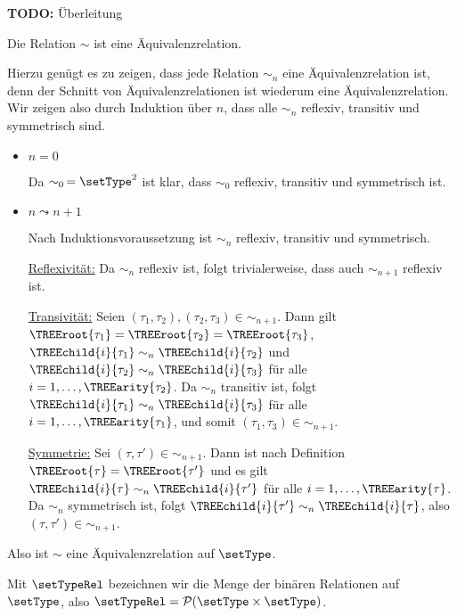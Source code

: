 {\bf TODO:} \"Uberleitung

\begin{lemma} \label{lemma:Lort:Aequivalenzrelation}
  Die Relation $\sim$ ist eine \"Aquivalenzrelation.
\end{lemma}

\begin{beweis}
  Hierzu gen\"ugt es zu zeigen, dass jede Relation $\sim_n$ eine \"Aquivalenzrelation ist, denn der Schnitt von
  \"Aquivalenzrelationen ist wiederum eine \"Aquivalenzrelation. Wir zeigen also durch Induktion \"uber $n$,
  dass alle $\sim_n$ reflexiv, transitiv und symmetrisch sind.
  \begin{itemize}
    \item $n = 0$

          Da $\sim_0\,=\setType^2$ ist klar, dass $\sim_0$ reflexiv, transitiv und symmetrisch ist.

    \item $n \leadsto n+1$

          Nach Induktionsvoraussetzung ist $\sim_n$ reflexiv, transitiv und symmetrisch.

          \noindent\underline{Reflexivit\"at:} Da $\sim_n$ reflexiv ist, folgt trivialerweise, dass auch $\sim_{n+1}$ reflexiv ist.

          \noindent\underline{Transivit\"at:} Seien $(\tau_1,\tau_2),(\tau_2,\tau_3)\in\sim_{n+1}$. Dann gilt
          $\TREEroot{\tau_1}=\TREEroot{\tau_2}=\TREEroot{\tau_3}$, $\TREEchild{i}{\tau_1} \sim_n \TREEchild{i}{\tau_2}$ und
          $\TREEchild{i}{\tau_2} \sim_n \TREEchild{i}{\tau_3}$ f\"ur alle $i = 1,\ldots,\TREEarity{\tau_2}$. Da
          $\sim_n$ transitiv ist, folgt $\TREEchild{i}{\tau_1} \sim_n \TREEchild{i}{\tau_3}$  f\"ur alle
          $i = 1,\ldots,\TREEarity{\tau_1}$, und somit $(\tau_1,\tau_3)\in\sim_{n+1}$.

          \noindent\underline{Symmetrie:} Sei $(\tau,\tau')\in\sim_{n+1}$. Dann ist nach Definition
          $\TREEroot{\tau} = \TREEroot{\tau'}$ und es gilt $\TREEchild{i}{\tau} \sim_n \TREEchild{i}{\tau'}$
          f\"ur alle $i = 1,\ldots,\TREEarity{\tau}$. Da $\sim_n$ symmetrisch ist,
          folgt $\TREEchild{i}{\tau'} \sim_n \TREEchild{i}{\tau}$, also $(\tau,\tau')\in\sim_{n+1}$.
  \end{itemize}
  Also ist $\sim$ eine \"Aquivalenzrelation auf $\setType$.
\end{beweis}

\begin{definition}
  Mit $\setTypeRel$ bezeichnen wir die Menge der bin\"aren Relationen auf $\setType$, also
  $\setTypeRel = \mathcal{P}(\setType \times \setType)$.
\end{definition}

